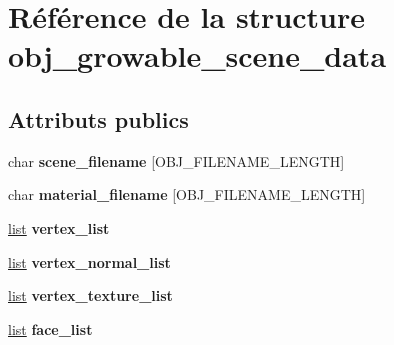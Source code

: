 \hypertarget{structobj__growable__scene__data}{\section{Référence de la structure obj\-\_\-growable\-\_\-scene\-\_\-data}
\label{structobj__growable__scene__data}
}
\subsection*{Attributs publics}
\begin{DoxyCompactItemize}
\item 
\hypertarget{structobj__growable__scene__data_ab11f689f063e184661781e94da0ccce1}{char {\bfseries scene\-\_\-filename} \mbox{[}O\-B\-J\-\_\-\-F\-I\-L\-E\-N\-A\-M\-E\-\_\-\-L\-E\-N\-G\-T\-H\mbox{]}}\label{structobj__growable__scene__data_ab11f689f063e184661781e94da0ccce1}

\item 
\hypertarget{structobj__growable__scene__data_a2b760bb727ab7b49bb9971fb3e6ed3a8}{char {\bfseries material\-\_\-filename} \mbox{[}O\-B\-J\-\_\-\-F\-I\-L\-E\-N\-A\-M\-E\-\_\-\-L\-E\-N\-G\-T\-H\mbox{]}}\label{structobj__growable__scene__data_a2b760bb727ab7b49bb9971fb3e6ed3a8}

\item 
\hypertarget{structobj__growable__scene__data_a13975a6dbaa62718add1043de08324d8}{\hyperlink{structlist}{list} {\bfseries vertex\-\_\-list}}\label{structobj__growable__scene__data_a13975a6dbaa62718add1043de08324d8}

\item 
\hypertarget{structobj__growable__scene__data_a8434f1f1123eaf06a4e87f7a4c157527}{\hyperlink{structlist}{list} {\bfseries vertex\-\_\-normal\-\_\-list}}\label{structobj__growable__scene__data_a8434f1f1123eaf06a4e87f7a4c157527}

\item 
\hypertarget{structobj__growable__scene__data_a85ee455560d2f8c8910257bb4b96c5bf}{\hyperlink{structlist}{list} {\bfseries vertex\-\_\-texture\-\_\-list}}\label{structobj__growable__scene__data_a85ee455560d2f8c8910257bb4b96c5bf}

\item 
\hypertarget{structobj__growable__scene__data_a371039f614baf3b51c079d577ed8247a}{\hyperlink{structlist}{list} {\bfseries face\-\_\-list}}\label{structobj__growable__scene__data_a371039f614baf3b51c079d577ed8247a}


\end{DoxyCompactItemize}
